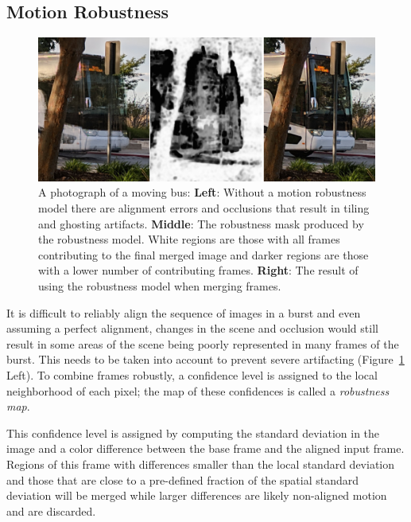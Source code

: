 \documentclass{sig-alternate}
\begin{document}

\pagebreak

\subsection{Motion Robustness}
\label{sec:robustnessModel}

\begin{figure}
\centering
\includegraphics[width=\columnwidth]{figures/wronski2019-figure-9-95quality.jpg}
\caption{A photograph of a moving bus: \textbf{Left}: Without a motion robustness model there are alignment errors and occlusions that result in tiling and ghosting artifacts. \textbf{Middle}: The robustness mask produced by the robustness model. White regions are those with all frames contributing to the final merged image and darker regions are those with a lower number of contributing frames. \textbf{Right}: The result of using the robustness model when merging frames. \cite{Wronski2019}}
\label{fig:Wronski2019Fig9}
\end{figure}

 
It is difficult to reliably align the sequence of images in a burst and even assuming a perfect alignment, changes in the scene and occlusion would still result in some areas of the scene being poorly represented in many frames of the burst. This needs to be taken into account to prevent severe artifacting (Figure~\ref{fig:Wronski2019Fig9} Left). To combine frames robustly, a confidence level is assigned to the local neighborhood of each pixel; the map of these confidences is called a \emph{robustness map}.

This confidence level is assigned by computing the standard deviation in the image and a color difference between the base frame and the aligned input frame. Regions of this frame with differences smaller than the local standard deviation and those that are close to a pre-defined fraction of the spatial standard deviation will be merged while larger differences are likely non-aligned motion and are discarded.
\end{document}
